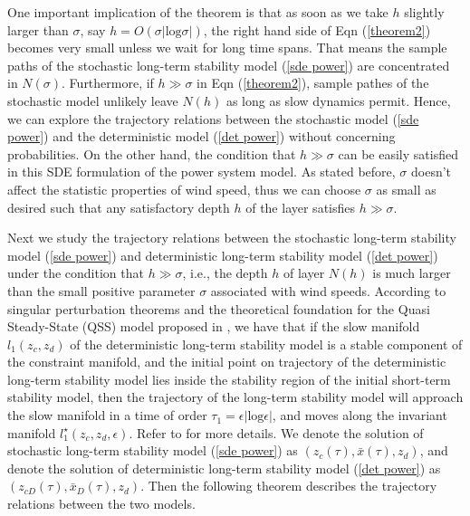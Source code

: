 \documentclass[journal]{IEEEtran}
\newcommand{\ee}{\epsilon}
\begin{document}
One important implication of the theorem is that as soon as we take $h$ slightly larger than $\sigma$, say $h=O(\sigma|\mbox{log}\sigma|)$, the right hand side of Eqn (\ref{theorem2}) becomes very small unless we wait for long time spans. That means the sample paths of the stochastic long-term stability model (\ref{sde power}) are concentrated in $N(\sigma)$. Furthermore, if $h\gg \sigma$ in Eqn (\ref{theorem2}), sample pathes of the stochastic model unlikely leave $N(h)$ as long as slow dynamics permit. Hence, we can explore the trajectory relations between the stochastic model (\ref{sde power}) and the deterministic model (\ref{det power}) without concerning probabilities.  On the other hand, the condition that $h\gg \sigma$ can be easily satisfied in this SDE formulation of the power system model. As stated before, $\sigma$ doesn't affect the statistic properties of wind speed, thus we can choose $\sigma$ as small as desired such that any satisfactory depth $h$ of the layer satisfies $h\gg\sigma$.












Next we study the trajectory relations between the stochastic long-term stability model (\ref{sde power}) and deterministic long-term stability model (\ref{det power}) under the condition that $h\gg \sigma$, i.e., the depth $h$ of layer $N(h)$ is much larger than the small positive parameter $\sigma$ associated with wind speeds. According to singular perturbation theorems\cite{Khalil:book}\cite{Lobry:article2} and the theoretical foundation for the Quasi Steady-State (QSS) model proposed in \cite{Wangxz:CAS}, we have that if the slow manifold $l_1(z_c,z_d)$ of the deterministic long-term stability model is a stable component of the constraint manifold, and the initial point on trajectory of the deterministic long-term stability model lies inside the stability region of the initial short-term stability model, then the trajectory of the long-term stability model will approach the slow manifold in a time of order $\tau_1=\ee|\mbox{log}\ee|$, and moves along the invariant manifold $l_1^\star(z_c,z_d,\ee)$. Refer to \cite{Wangxz:CAS} for more details. 
We denote the solution of stochastic long-term stability model (\ref{sde power}) as $(z_{c}(\tau),\bar{x}(\tau),z_d)$, and denote the solution of deterministic long-term stability model (\ref{det power}) as $(z_{cD}(\tau),\bar{x}_D(\tau),z_d)$. Then the following theorem describes the trajectory relations between the two models.
\end{document}
